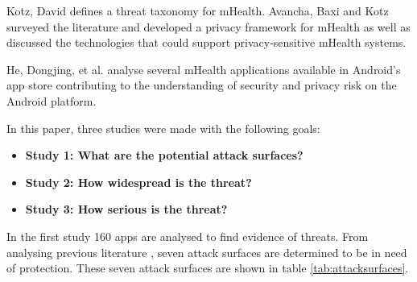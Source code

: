 Kotz, David \cite{kotz2011threat} defines a threat taxonomy for mHealth. Avancha, Baxi and Kotz \cite{avancha2012privacy} surveyed the literature and developed a privacy framework for mHealth as well as discussed the technologies that could support privacy-sensitive mHealth systems.

He, Dongjing, et al. \cite{he2014security} analyse several mHealth applications available in Android's app store contributing to the understanding of security and privacy risk on the Android platform.

In this paper, three studies were made with the following goals:
\begin{itemize}
	\item \textbf{Study 1: What are the potential attack surfaces?}
	\item \textbf{Study 2: How widespread is the threat?}
	\item \textbf{Study 3: How serious is the threat?}
\end{itemize}

 In the first study 160 apps are analysed to find evidence of threats. From analysing previous literature \cite{zhou2013identity,naveed2014inside,aviv2012practicality,cai2012practicality,chin2011analyzing,fsecure,sevenwaystohangyourselfwithandroid}, seven attack surfaces are determined to be in need of protection. These seven attack surfaces are shown in table \ref{tab:attacksurfaces}.

